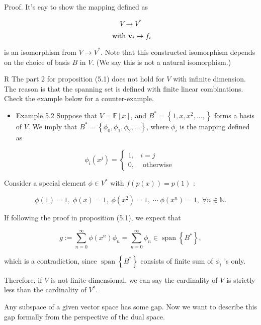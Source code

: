 \documentclass[11pt]{article}
\begin{document}
Proof. It's eay to show the mapping defined as

\[
V \rightarrow  {V}^{ * }
\]

\[
\text{ with }{\bf v}_{i} \mapsto  {f}_{i}
\]

is an isomorphism from \(V \rightarrow  {V}^{ * }\). Note that this constructed isomorphism depends on the choice of basis \(B\) in \(V\). (We say this is not a natural isomorphism.)

R The part 2 for proposition (5.1) does not hold for \(V\) with infinite dimension. The reason is that the spanning set is defined with finite linear combinations. Check the example below for a counter-example.

\begin{itemize}
\item Example 5.2 Suppose that \(V = \mathbb{F}\left\lbrack  x\right\rbrack\), and \({B}^{ * } = \left\{  {1,x,{x}^2,\ldots ,}\right\}\) forms a basis of \(V\). We imply that \({B}^{ * } = \left\{  {{\phi }_{0},{\phi }_1,{\phi }_2,\ldots }\right\}\), where \({\phi }_{i}\) is the mapping defined as
\end{itemize}

\[
{\phi }_{i}\left( {x}^{j}\right)  = \left\{  \begin{array}{ll} 1, & i = j \\  0, & \text{ otherwise } \end{array}\right.
\]

Consider a special element \(\phi  \in  {V}^{ * }\) with \(f\left( {p\left( x\right) }\right)  = p\left( 1\right)\) :

\[
\phi \left( 1\right)  = 1,\;\phi \left( x\right)  = 1,\;\phi \left( {x}^2\right)  = 1,\;\cdots \;\phi \left( {x}^n\right)  = 1,\;\forall n \in  \mathbb{N}.
\]

If following the proof in proposition (5.1), we expect that

\[
g \mathrel{\text{ := }} \mathop{\sum }\limits_{{n = 0}}^{\infty }\phi \left( {x}^n\right) {\phi }_n = \mathop{\sum }\limits_{{n = 0}}^{\infty }{\phi }_n \in  \operatorname{span}\left\{  {B}^{ * }\right\}  ,
\]

which is a contradiction, since \(\operatorname{span}\left\{  {B}^{ * }\right\}\) consists of finite sum of \({\phi }_{i}\) ’s only.

Therefore, if \(V\) is not finite-dimensional, we can say the cardinality of \(V\) is strictly less than the cardinality of \({V}^{ * }\).

Any subspace of a given vector space has some gap. Now we want to describe this gap formally from the perspective of the dual space.
\end{document}

